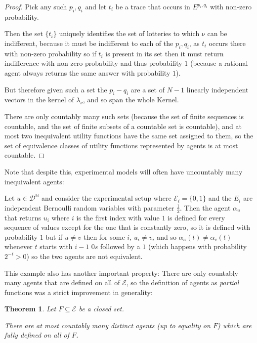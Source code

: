 \documentclass[a4paper]{book}
\newtheorem{theorem}{Theorem}
\begin{document}
\begin{proof}
Pick any such $p_i, q_i$ and let $t_i$ be a trace that occurs in $E^{p_i, q_i}$
with non-zero probability.

Then the set $\{t_i\}$ uniquely identifies the set of lotteries to which
$\nu$ can be indifferent, because it must be indifferent to each of the $p_i, q_i$,
as $t_i$ occurs there with non-zero probability so if $t_i$ is present
in its set then it must return indifference with non-zero probability and
thus probability $1$ (because a rational agent always returns the same
answer with probability $1$).

But therefore given such a set the $p_i - q_i$ are a set of $N - 1$ linearly
independent vectors in the kernel of $\lambda_\nu$, and so span the whole Kernel.

There are only countably many such sets (because the set of finite sequences is
countable, and the set of finite subsets of a countable set is countable), and
at most two inequivalent utility functions have the same set assigned to them,
so the set of equivalence classes of utility functions represented by agents
is at most countable.

\end{proof}

Note that despite this, experimental models will often have uncountably many
inequivalent agents:

Let $u \in \mathcal{D}^\mathbb{N}$
and consider the experimental setup where
$\mathcal{E}_i = \{0, 1\}$
and the $E_i$
are independent Bernoulli random
variables with parameter $\frac{1}{2}$.
Then the agent $\alpha_u$
that returns $u_i$
where $i$
is the first index with value $1$
is defined for every sequence of values except for the one that is
constantly zero, so it is defined with probability $1$
but if $u \neq v$
then for some $i$,
$u_i \neq v_i$
and so $\alpha_u(t) \neq \alpha_v(t)$
whenever $t$
starts with $i - 1$
$0s$
followed by a $1$
(which happens with probability $2^{-i} > 0$)
so the two agents are not equivalent.

This example also has another important property: There are only countably
many agents that are defined on all of $\mathcal{E}$,
so the definition of agents as \textit{partial} functions was a strict
improvement in generality:

\begin{theorem}
Let $F \subseteq \mathcal{E}$
be a closed set.

There are at most countably many distinct agents (up to equality on $F$)
which are fully defined on all of $F$.
\end{theorem}
\end{document}
